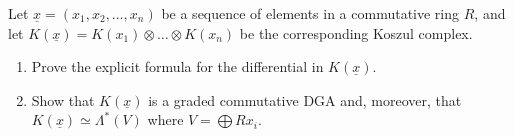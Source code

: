 \documentclass[12pt]{article}
\begin{document}
\begin{prob}
	Let $\underline{x} = (x_1, x_2,\ldots, x_n)$ be a sequence of 
	elements in a commutative ring $R$, and let $K(\underline{x})=K(x_1) \otimes \ldots \otimes K(x_n)$ 
	be the corresponding Koszul  complex. 

	\begin{enumerate}  
		\item Prove the explicit formula for the differential in $K(\underline{x})$. 
		\item Show that $K(\underline{x})$ 
		is a graded commutative DGA and, moreover, that $K(\underline{x}) \simeq \Lambda^*(V)$ where $V = \bigoplus Rx_i$.
	\end{enumerate}
\end{prob}
\begin{sol}

\end{sol}
\end{document}
